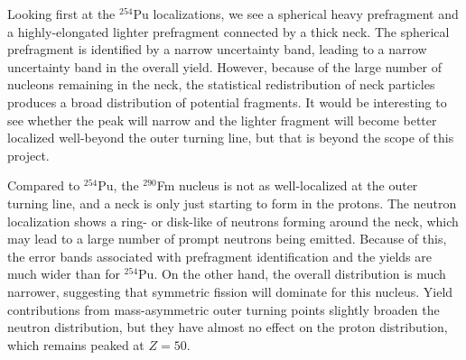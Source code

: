 Looking first at the $^{254}$Pu localizations, we see a spherical heavy prefragment and a highly-elongated lighter prefragment connected by a thick neck. The spherical prefragment is identified by a narrow uncertainty band, leading to a narrow uncertainty band in the overall yield. However, because of the large number of nucleons remaining in the neck, the statistical redistribution of neck particles produces a broad distribution of potential fragments. It would be interesting to see whether the peak will narrow and the lighter fragment will become better localized well-beyond the outer turning line, but that is beyond the scope of this project.


Compared to $^{254}$Pu, the $^{290}$Fm nucleus is not as well-localized at the outer turning line, and a neck is only just starting to form in the protons. The neutron localization shows a ring- or disk-like of neutrons forming around the neck, which may lead to a large number of prompt neutrons being emitted. Because of this, the error bands associated with prefragment identification and the yields are much wider than for $^{254}$Pu. On the other hand, the overall distribution is much narrower, suggesting that symmetric fission will dominate for this nucleus. Yield contributions from mass-asymmetric outer turning points slightly broaden the neutron distribution, but they have almost no effect on the proton distribution, which remains peaked at $Z=50$.

